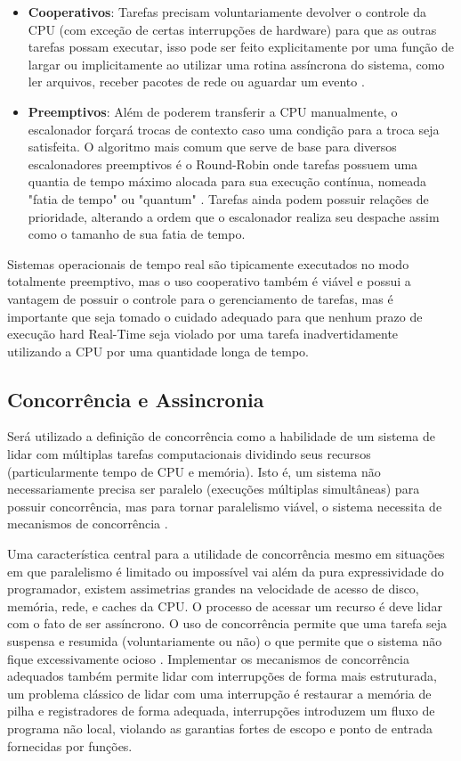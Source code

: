 \begin{itemize}
    \item \textbf{Cooperativos}: Tarefas precisam voluntariamente devolver o controle da CPU (com exceção de certas interrupções de hardware) para que as outras tarefas possam executar, isso pode ser feito explicitamente por uma função de largar ou implicitamente ao utilizar uma rotina assíncrona do sistema, como ler arquivos, receber pacotes de rede ou aguardar um evento \cite{OperatingSystemConcepts}.

    \item \textbf{Preemptivos}: Além de poderem transferir a CPU manualmente, o escalonador forçará trocas de contexto caso uma condição para a troca seja satisfeita. O algoritmo mais comum que serve de base para diversos escalonadores preemptivos é o Round-Robin onde tarefas possuem uma quantia de tempo máximo alocada para sua execução contínua, nomeada "fatia de tempo" ou "quantum" \cite{ModernOperatingSystems}. Tarefas ainda podem possuir relações de prioridade, alterando a ordem que o escalonador realiza seu despache assim como o tamanho de sua fatia de tempo.
\end{itemize}

Sistemas operacionais de tempo real são tipicamente executados no modo totalmente preemptivo, mas o uso cooperativo também é viável e possui a vantagem de possuir o controle para o gerenciamento de tarefas, mas é importante que seja tomado o cuidado adequado para que nenhum prazo de execução hard Real-Time seja violado por uma tarefa inadvertidamente utilizando a CPU por uma quantidade longa de tempo.

\subsection{Concorrência e Assincronia}

Será utilizado a definição de concorrência como a habilidade de um sistema de lidar com múltiplas tarefas computacionais dividindo seus recursos (particularmente tempo de CPU e memória). Isto é, um sistema não necessariamente precisa ser paralelo (execuções múltiplas simultâneas) para possuir concorrência, mas para tornar paralelismo viável, o sistema necessita de mecanismos de concorrência \cite{MakingReliableDistSystems}.

Uma característica central para a utilidade de concorrência mesmo em situações em que paralelismo é limitado ou impossível vai além da pura expressividade do programador, existem assimetrias grandes na velocidade de acesso de disco, memória, rede, e caches da CPU. O processo de acessar um recurso é deve lidar com o fato de ser assíncrono. O uso de concorrência permite que uma tarefa seja suspensa e resumida (voluntariamente ou não) o que permite que o sistema não fique excessivamente ocioso \cite{OperatingSystemConcepts}. Implementar os mecanismos de concorrência adequados também permite lidar com interrupções de forma mais estruturada, um problema clássico de lidar com uma interrupção é restaurar a memória de pilha e registradores de forma adequada, interrupções introduzem um fluxo de programa não local, violando as garantias fortes de escopo e ponto de entrada fornecidas por funções.

